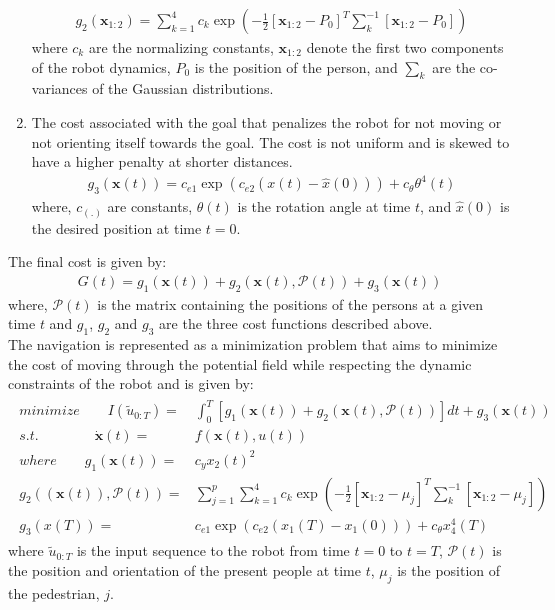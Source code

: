 \begin{enumerate}
	\begin{align}
	g_{2}(\textbf{x}_{1:2}) = \sum_{k=1}^{4}c_{k}\exp(-\frac{1}{2}[\textbf{x}_{1:2} - P_0]^{T}\sum^{-1}_{k}[\textbf{x}_{1:2} - P_0])
	\end{align} 
	where $c_{k}$ are the normalizing constants, $\textbf{x}_{1:2}$ denote the first two components of the robot dynamics, $P_0$ is the position of the person, and $\sum_k$ are the co-variances of the Gaussian distributions.
	\item The cost associated with the goal that penalizes the robot for not moving or not orienting itself towards the goal. The cost is not uniform and is skewed to have a higher penalty at shorter distances.
	\begin{align}
	g_{3}(\textbf{x}(t)) = c_{e1}\exp(c_{e2}(x(t) - \hat{x}(0))) + c_{\theta}\theta^{4}(t)
	\end{align}
	where, $c_{(.)}$ are constants, $\theta(t)$ is the rotation angle at time $t$, and $\hat{x}(0)$ is the desired position at time $t=0$.
\end{enumerate}

The final cost is given by: 
\begin{align}
G(t) = g_{1}(\textbf{x}(t)) + g_{2}(\textbf{x}(t), \mathcal{P}(t)) + g_{3}(\textbf{x}(t))
\end{align}
where, $\mathcal{P}(t)$ is the matrix containing the positions of the persons at a given time $t$ and $g_{1}$, $g_{2}$ and $g_{3}$ are the three cost functions described above.\\
The navigation is represented as a minimization problem that aims to minimize the cost of moving through the potential field while respecting the dynamic constraints of the robot and is given by:
\begin{align}
\label{eq:sven_optimziation}
\begin{split}
minimize \qquad I(\tilde{u}_{0:T}) = &\int_{0}^{T} [g_{1}(\textbf{x}(t)) + g_{2}(\textbf{x}(t), \mathcal{P}(t))]dt + g_{3}(\textbf{x}(t))\\
s.t. \qquad \qquad \dot{\textbf{x}}(t) = & f(\textbf{x}(t),u(t)) \\
where \qquad g_{1}(\textbf{x}(t)) = &c_{y}x_{2}(t)^{2}\\
g_{2}((\textbf{x}(t)), \mathcal{P}(t)) = &\sum_{j=1}^{p} \sum_{k=1}^{4} c_{k}\exp(-\frac{1}{2}[\textbf{x}_{1:2} - \mu_{j}]^{T}\sum^{-1}_{k}[\textbf{x}_{1:2} - \mu_{j}])\\
g_{3}(x(T)) = & c_{e1}\exp(c_{e2}(x_{1}(T) - x_{1}(0))) + c_{\theta}x_{4}^{4}(T)
\end{split}
\end{align}
where $\tilde{u}_{0:T}$ is the input sequence to the robot from time $t=0$ to $t=T$, $\mathcal{P}(t)$ is the position and orientation of the present people at time $t$, $\mu_{j}$ is the position of the pedestrian, $j$.\\

